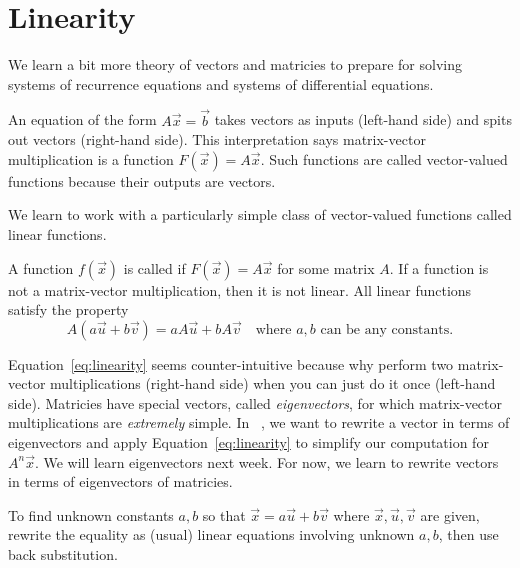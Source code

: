 \documentclass[../main.tex]{subfiles}
\begin{document}
 \section{Linearity}

We learn a bit more theory of vectors and matricies to prepare for solving systems of recurrence equations and systems of differential equations.

An equation of the form \(A \vec{x} = \vec{b}\) takes vectors as inputs (left-hand side) and spits out vectors (right-hand side). This interpretation says matrix-vector multiplication is a function \(F(\vec{x}) = A \vec{x}\). Such functions are called vector-valued functions because their outputs are vectors.


We learn to work with a particularly simple class of vector-valued functions called linear functions.

\begin{definition}[linearity] \label{def:linearity}
  A function \(f(\vec{x})\) is called  if \(F(\vec{x}) = A\vec{x}\) for some matrix \(A\). If a function is not a matrix-vector multiplication, then it is not linear. All linear functions satisfy the property
  \begin{equation} \label{eq:linearity}
    A(a \vec{u} + b \vec{v}) = a A\vec{u} + b A\vec{v} \quad\text{where \(a,b\) can be any constants.}
  \end{equation}
\end{definition}

Equation~\eqref{eq:linearity} seems counter-intuitive because why perform two matrix-vector multiplications (right-hand side) when you can just do it once (left-hand side).  Matricies have special vectors, called \emph{eigenvectors}, for which matrix-vector multiplications are \emph{extremely} simple.  In \thecoursesubject{}~\thecoursenumb{}, we want to rewrite a vector in terms of eigenvectors and apply Equation~\ref{eq:linearity} to simplify our computation for \(A^{n} \vec{x}\). We will learn eigenvectors next week. For now, we learn to rewrite vectors in terms of eigenvectors of matricies.

\begin{method} \label{method:linear-combination}
  To find unknown constants \(a,b\) so that \(\vec{x} = a \vec{u} + b \vec{v}\) where \(\vec{x}, \vec{u}, \vec{v}\) are given, rewrite the equality as (usual) linear equations involving unknown \(a,b\), then use back substitution.
\end{method}
\end{document}
